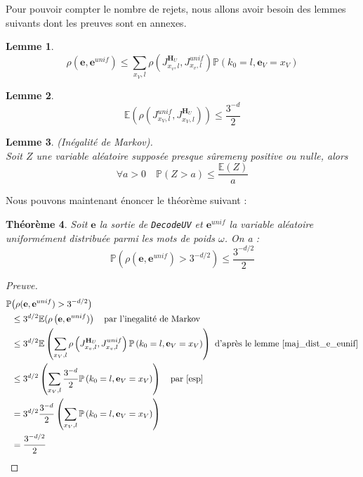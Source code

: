 \documentclass[12pt]{article}
\theoremstyle{plain}
\newtheorem{thm}{Théorème}[section]
\newtheorem{lemme}[thm]{Lemme}
\newcommand{\e}{\mathbf{e}}
\begin{document}
Pour pouvoir compter le nombre de rejets, nous allons avoir besoin des lemmes suivants dont les preuves sont en annexes.

\begin{lemme}\label{maj_dist_e_eunif}
$$ \rho\left(\e ,\e^{unif}\right) \leq \sum\limits_{x_V,l} \rho\left(J_{x_v,l}^{\mathbf{H}_U},J_{x_v,l}^{unif}\right)\mathbb{P}\left(k_0 = l, \e_V = x_V\right) $$ 
\end{lemme}


\begin{lemme}
\begin{equation}\label{esp}
\mathbb{E}\left(\rho\left(J_{x_V,l}^{unif},J_{x_V, l}^{\mathbf{H}_U}\right)\right) \leq \frac{3^{-d}}{2}
\end{equation}

\end{lemme}

\begin{lemme}\label{markov}(Inégalité de Markov).\\
Soit $Z$ une variable aléatoire supposée presque sûremeny positive ou nulle, alors $$\forall a>0\quad \mathbb{P}(Z > a) \leq \frac{\mathbb{E}(Z)}{a}$$
\end{lemme}

Nous pouvons maintenant énoncer le théorème suivant :

\begin{thm}\label{rejet}
Soit $\e$ la sortie de \verb|DecodeUV| et $\e^{unif}$ la variable aléatoire uniformément distribuée parmi les mots de poids $\omega$. On a :
$$ \mathbb{P}\left(\rho(\e,\e^{unif})>3^{-d/2}\right) \leq \frac{3^{-d/2}}{2} $$
\end{thm}

\begin{proof}[Preuve]
\begin{equation*}
\begin{split}
\mathbb{P}&\big(\rho(\e,\e^{unif})>3^{-d/2}\big) \\
&\leq 3^{d/2}\mathbb{E}(\rho\left(\e,\e^{unif})\right) \quad \text{par l'inegalité de Markov}\\
&\leq 3^{d/2}\mathbb{E}\left(\sum\limits_{x_V,l} \rho\left(J_{x_v,l}^{\mathbf{H}_U},J_{x_v,l}^{unif}\right)\mathbb{P}\left(k_0 = l , \e_V = x_V\right)\right) \text{ d'après le lemme \ref{maj_dist_e_eunif}}\\
&\leq 3^{d/2}\left(\sum\limits_{x_V,l} \frac{3^{-d}}{2}\mathbb{P}\left(k_0 = l ,\e_V = x_V\right)\right) \quad \text{par \eqref{esp}}\\
&= 3^{d/2} \frac{3^{-d}}{2}\left(\sum\limits_{x_V,l}\mathbb{P}\left(k_0 = l ,\e_V = x_V\right)\right) \\
&= \frac{3^{-d/2}}{2}\\
\end{split}
\end{equation*}
\end{proof}
\end{document}
